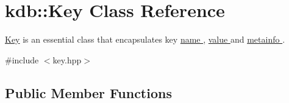 \hypertarget{classkdb_1_1Key}{\section{kdb\+:\+:Key Class Reference}
\label{classkdb_1_1Key}
}


\hyperlink{classkdb_1_1Key}{Key} is an essential class that encapsulates key \hyperlink{group__keyname}{name }, \hyperlink{group__keyvalue}{value } and \hyperlink{group__keymeta}{metainfo }.  




{\ttfamily \#include $<$key.\+hpp$>$}

\subsection*{Public Member Functions}
